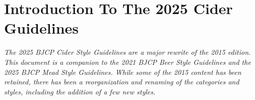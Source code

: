 \section*{Introduction To The 2025 Cider Guidelines}

\textit{The 2025 BJCP Cider Style Guidelines are a major rewrite of the 2015 edition. This document is a companion to the 2021 BJCP Beer Style Guidelines and the 2025 BJCP Mead Style Guidelines. While some of the 2015 content has been retained, there has been a reorganization and renaming of the categories and styles, including the addition of a few new styles.}

